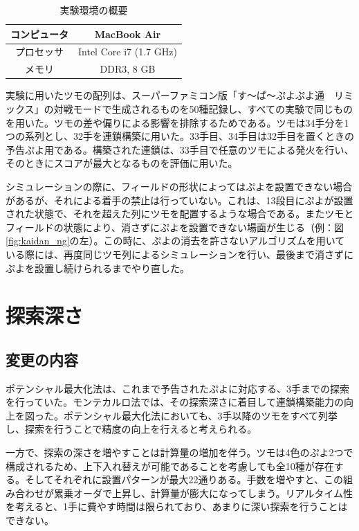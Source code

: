 \documentclass[12pt]{jreport}
\begin{document}
\begin{table}[tb]
\begin{center}
\caption{実験環境の概要} \label{tab:spec}
\begin{tabular}{|c|c|} \hline
コンピュータ & MacBook Air\\ \hline
プロセッサ & Intel Core i7 (1.7 GHz)\\ \hline
メモリ & DDR3, 8 GB\\ \hline
\end{tabular}
\end{center}
\end{table}

実験に用いたツモの配列は、スーパーファミコン版「す～ぱ～ぷよぷよ通　リミックス」の対戦モードで生成されるものを50種記録し、すべての実験で同じものを用いた。ツモの差や偏りによる影響を排除するためである。ツモは34手分を1つの系列とし、32手を連鎖構築に用いた。33手目、34手目は32手目を置くときの予告ぷよ用である。構築された連鎖は、33手目で任意のツモによる発火を行い、そのときにスコアが最大となるものを評価に用いた。

シミュレーションの際に、フィールドの形状によってはぷよを設置できない場合があるが、それによる着手の禁止は行っていない。これは、13段目にぷよが設置された状態で、それを超えた列にツモを配置するような場合である。またツモとフィールドの状態により、消さずにぷよを設置できない場面が生じる（例：図\ref{fig:kaidan_ng}の左）。この時に、ぷよの消去を許さないアルゴリズムを用いている際には、再度同じツモ列によるシミュレーションを行い、最後まで消さずにぷよを設置し続けられるまでやり直した。

\section{探索深さ}
\subsection{変更の内容}
ポテンシャル最大化法は、これまで予告されたぷよに対応する、3手までの探索を行っていた。モンテカルロ法\cite{puyo_monte}では、その探索深さに着目して連鎖構築能力の向上を図った。ポテンシャル最大化法においても、3手以降のツモをすべて列挙し、探索を行うことで精度の向上を行えると考えられる。

一方で、探索の深さを増やすことは計算量の増加を伴う。ツモは4色のぷよ2つで構成されるため、上下入れ替えが可能であることを考慮しても全10種が存在する。そしてそれぞれに設置パターンが最大22通りある。手数を増やすと、この組み合わせが累乗オーダで上昇し、計算量が膨大になってしまう。リアルタイム性を考えると、1手に費やす時間は限られており、あまりに深い探索を行うことはできない。
\end{document}
